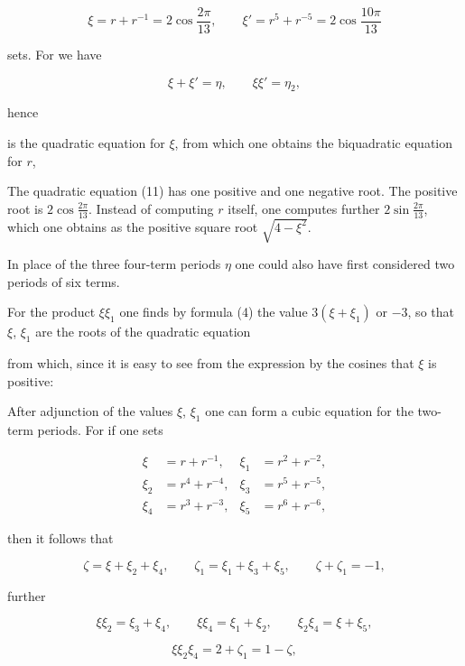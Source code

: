 \[
\xi = r + r^{-1} = 2\cos\frac{2\pi}{13}, \qquad \xi' = r^5 + r^{-5} = 2\cos\frac{10\pi}{13}
\]

sets. For we have

\[
\xi + \xi' = \eta, \qquad \xi\xi' = \eta_2,
\]

hence


is the quadratic equation for $\xi$, from which one obtains the biquadratic
equation for $r$,


The quadratic equation (11) has one positive and one negative
root. The positive root is $2\cos\frac{2\pi}{13}$. Instead of computing $r$
itself, one computes further $2\sin\frac{2\pi}{13}$, which one obtains as
the positive square root $\sqrt{4 - \xi^2}$.

In place of the three four-term periods $\eta$ one could also
have first considered two periods of six terms.


For the product $\xi\xi_1$ one finds by formula (4) the
value $3(\xi + \xi_1)$ or $-3$, so that $\xi$, $\xi_1$ are the roots of the quadratic equation


from which, since it is easy to see from the expression by the
cosines that $\xi$ is positive:


After adjunction of the values $\xi$, $\xi_1$ one can form a cubic
equation for the two-term periods. For if one
sets

\[
\begin{aligned}
\xi &= r + r^{-1}, & \xi_1 &= r^2 + r^{-2},\\
\xi_2 &= r^4 + r^{-4}, & \xi_3 &= r^5 + r^{-5},\\
\xi_4 &= r^3 + r^{-3}, & \xi_5 &= r^6 + r^{-6},
\end{aligned}
\]

then it follows that

\[
\zeta = \xi + \xi_2 + \xi_4, \qquad \zeta_1 = \xi_1 + \xi_3 + \xi_5, \qquad \zeta + \zeta_1 = -1,
\]

further

\[
\xi\xi_2 = \xi_3 + \xi_4, \qquad \xi\xi_4 = \xi_1 + \xi_2, \qquad \xi_2\xi_4 = \xi + \xi_5,
\]

\[
\xi\xi_2\xi_4 = 2 + \zeta_1 = 1 - \zeta,
\]
